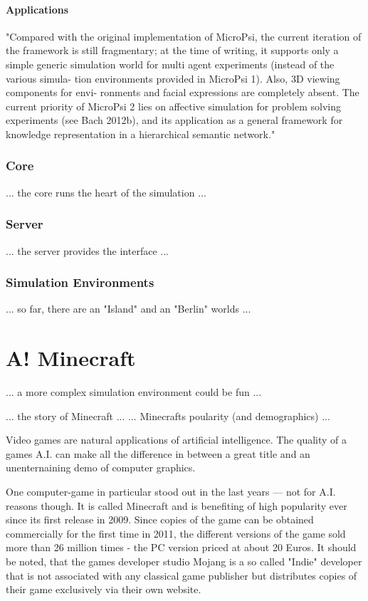             \paragraph{Applications}
"Compared with the original implementation of MicroPsi, the current iteration of the framework is still fragmentary; at the time of writing, it supports only a simple generic simulation world for multi agent experiments (instead of the various simula- tion environments provided in MicroPsi 1). Also, 3D viewing components for envi- ronments and facial expressions are completely absent.
The current priority of MicroPsi 2 lies on affective simulation for problem solving experiments (see Bach 2012b), and its application as a general framework for knowledge representation in a hierarchical semantic network."~\cite{conf/agi/Bach12}


        \subsubsection{Core}
... the core runs the heart of the simulation ...

        \subsubsection{Server}
... the server provides the interface ...

        \subsubsection{Simulation Environments}
... so far, there are an "Island" and an "Berlin" worlds ...

    \section{A! Minecraft}
... a more complex simulation environment could be fun ...

... the story of Minecraft ...
... Minecrafts poularity (and demographics) ...

Video games are natural applications of artificial intelligence. The quality of a games A.I. can make all the difference in between a great title and an unenternaining demo of computer graphics.

One computer-game in particular stood out in the last years --- not for A.I. reasons though. It is called Minecraft and is benefiting of high popularity ever since its first release in 2009. Since copies of the game can be obtained commercially for the first time in 2011, the different versions of the game sold more than 26 million times - the PC version priced at about 20 Euros. It should be noted, that the games developer studio Mojang is a so called "Indie" developer that is not associated with any classical game publisher but distributes copies of their game exclusively via their own website.

